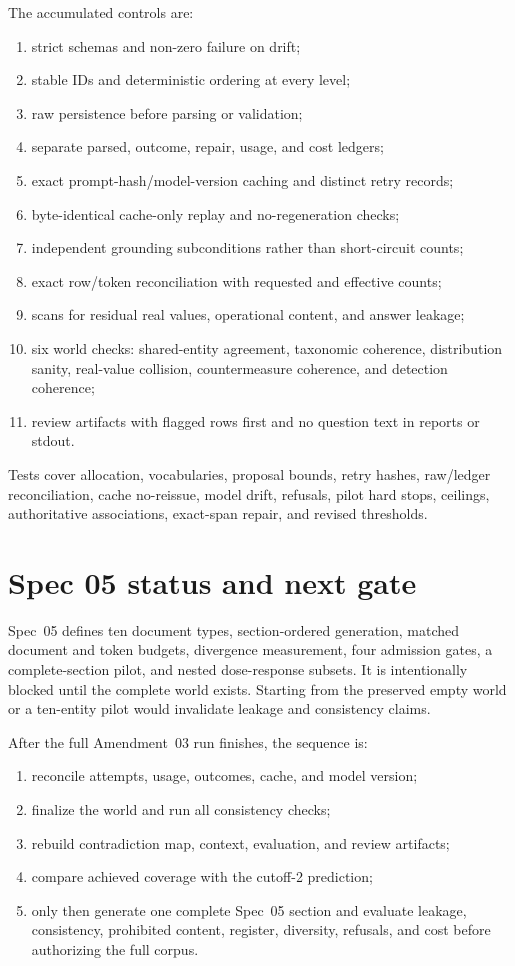 \documentclass[11pt]{article}
\begin{document}
The accumulated controls are:
\begin{enumerate}[nosep]
  \item strict schemas and non-zero failure on drift;
  \item stable IDs and deterministic ordering at every level;
  \item raw persistence before parsing or validation;
  \item separate parsed, outcome, repair, usage, and cost ledgers;
  \item exact prompt-hash/model-version caching and distinct retry records;
  \item byte-identical cache-only replay and no-regeneration checks;
  \item independent grounding subconditions rather than short-circuit counts;
  \item exact row/token reconciliation with requested and effective counts;
  \item scans for residual real values, operational content, and answer leakage;
  \item six world checks: shared-entity agreement, taxonomic coherence,
        distribution sanity, real-value collision, countermeasure coherence,
        and detection coherence;
  \item review artifacts with flagged rows first and no question text in
        reports or stdout.
\end{enumerate}

Tests cover allocation, vocabularies, proposal bounds, retry hashes, raw/ledger
reconciliation, cache no-reissue, model drift, refusals, pilot hard stops,
ceilings, authoritative associations, exact-span repair, and revised thresholds.

\section{Spec 05 status and next gate}

Spec~05 defines ten document types, section-ordered generation, matched document
and token budgets, divergence measurement, four admission gates, a
complete-section pilot, and nested dose-response subsets. It is intentionally
blocked until the complete world exists. Starting from the preserved empty
world or a ten-entity pilot would invalidate leakage and consistency claims.

After the full Amendment~03 run finishes, the sequence is:
\begin{enumerate}[nosep]
  \item reconcile attempts, usage, outcomes, cache, and model version;
  \item finalize the world and run all consistency checks;
  \item rebuild contradiction map, context, evaluation, and review artifacts;
  \item compare achieved coverage with the cutoff-2 prediction;
  \item only then generate one complete Spec~05 section and evaluate leakage,
        consistency, prohibited content, register, diversity, refusals, and
        cost before authorizing the full corpus.
\end{enumerate}
\end{document}
